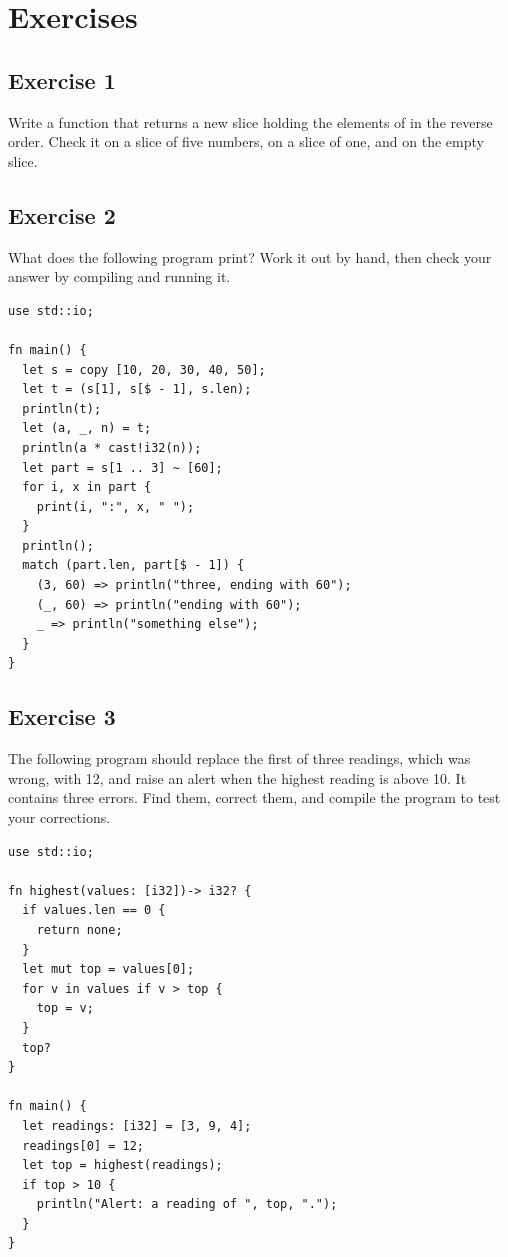 \vfill%
\pagebreak

\section*{Exercises}
%
\subsection*{Exercise 1}

Write a function  that returns a new slice
holding the elements of  in the reverse order. Check it on a slice
of five numbers, on a slice of one, and on the empty slice.

\subsection*{Exercise 2}

What does the following program print? Work it out by hand, then check your
answer by compiling and running it.

\begin{lstlisting}[style=coloredverbatim]
use std::io;

fn main() {
  let s = copy [10, 20, 30, 40, 50];
  let t = (s[1], s[$ - 1], s.len);
  println(t);
  let (a, _, n) = t;
  println(a * cast!i32(n));
  let part = s[1 .. 3] ~ [60];
  for i, x in part {
    print(i, ":", x, " ");
  }
  println();
  match (part.len, part[$ - 1]) {
    (3, 60) => println("three, ending with 60");
    (_, 60) => println("ending with 60");
    _ => println("something else");
  }
}
\end{lstlisting}

\subsection*{Exercise 3}

The following program should replace the first of three readings, which was
wrong, with 12, and raise an alert when the highest reading is above 10. It
contains three errors. Find them, correct them, and compile the program to test
your corrections.

\begin{lstlisting}[style=coloredverbatimError, caption=Ymir program with errors]
use std::io;

fn highest(values: [i32])-> i32? {
  if values.len == 0 {
    return none;
  }
  let mut top = values[0];
  for v in values if v > top {
    top = v;
  }
  top?
}

fn main() {
  let readings: [i32] = [3, 9, 4];
  readings[0] = 12;
  let top = highest(readings);
  if top > 10 {
    println("Alert: a reading of ", top, ".");
  }
}
\end{lstlisting}

